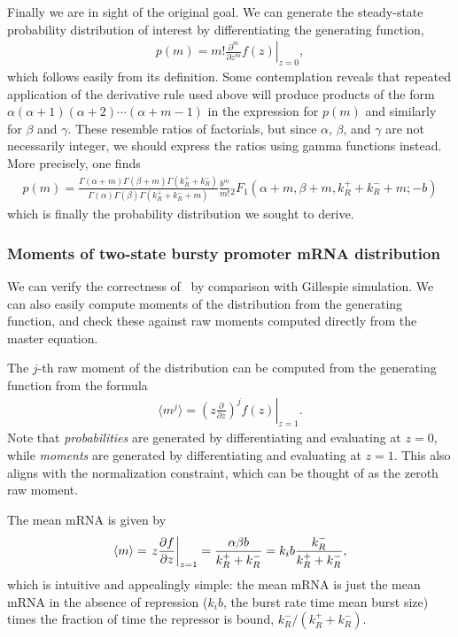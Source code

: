Finally we are in sight of the original goal. We can generate the steady-state
probability distribution of interest by differentiating the generating function,
\begin{align}
p(m) = m! \left.\frac{\partial^m}{\partial z^m} f(z) \right|_{z=0},
\end{align}
which follows easily from its definition. Some contemplation reveals that
repeated application of the derivative rule used above will produce products of
the form $\alpha(\alpha+1)(\alpha+2)\cdots(\alpha+m-1)$ in the expression for
$p(m)$ and similarly for $\beta$ and $\gamma$. These resemble ratios of
factorials, but since $\alpha$, $\beta$, and $\gamma$ are not necessarily
integer, we should express the ratios using gamma functions instead. More
precisely, one finds
\begin{align}
p(m) = \frac{
        \Gamma(\alpha + m)\Gamma(\beta + m)\Gamma(k_R^+ + k_R^-)
        }
        {
        \Gamma(\alpha)\Gamma(\beta)\Gamma(k_R^+ + k_R^- + m)
        }
\frac{b^m}{m!}{_2F_1}(\alpha+m, \beta+m, k_R^++k_R^-+m; -b)
\label{eq:p_m_bursty+rep_appdx}
\end{align}
which is finally the probability distribution we sought to derive.

\subsubsection{Moments of two-state bursty promoter mRNA distribution}

We can verify the correctness of~ by comparison with
Gillespie simulation. We can also easily compute moments of the distribution
from the generating function, and check these against raw moments computed
directly from the master equation.

The $j$-th raw moment of the distribution can be computed from the generating
function from the formula
\begin{align}
\langle m^j \rangle
= \left. \left(z \frac{\partial}{\partial z}\right)^j f(z)\right|_{z=1}.
\end{align}
Note that \textit{probabilities} are generated by differentiating and evaluating
at $z=0$, while \textit{moments} are generated by differentiating and evaluating
at $z=1$. This also aligns with the normalization constraint, which can be
thought of as the zeroth raw moment.
        
The mean mRNA is given by
\begin{align}
\langle m \rangle = \left.z \pderiv[f]{z} \right|_{z=1}
= \frac{\alpha\beta b}{k_R^+ + k_R^-}
= k_i b\frac{k_R^-}{k_R^+ + k_R^-},
\end{align}
which is intuitive and appealingly simple: the mean mRNA is just the mean mRNA
in the absence of repression ($k_i b$, the burst rate time mean burst size)
times the fraction of time the repressor is bound, $k_R^-/(k_R^+ + k_R^-)$.

